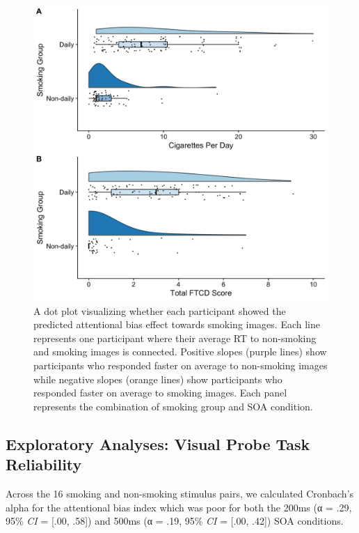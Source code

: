 \documentclass[empirical, authordate]{jote-new-article}
\begin{document}
\begin{figure}[t]

  \begin{fullwidth}
    \includegraphics[width=\linewidth]{media/image5.jpeg}
    \caption{
      A dot plot visualizing whether each participant showed the predicted attentional bias effect towards smoking images. Each line represents one participant where their average RT to non-smoking and smoking images is connected. Positive slopes (purple lines) show participants who responded faster on average to non-smoking images while negative slopes (orange lines) show participants who responded faster on average to smoking images. Each panel represents the combination of smoking group and SOA condition.
    }
    \label{fig:5}
  \end{fullwidth}


\end{figure}


\subsection{Exploratory Analyses: Visual Probe Task Reliability}

Across the 16 smoking and non-smoking stimulus pairs, we calculated Cronbach's alpha for the attentional bias index which was poor for both the 200ms (α = .29, 95\% \emph{CI} = [.00, .58]) and 500ms (α = .19, 95\% \emph{CI} = [.00, .42]) SOA conditions.
\end{document}
